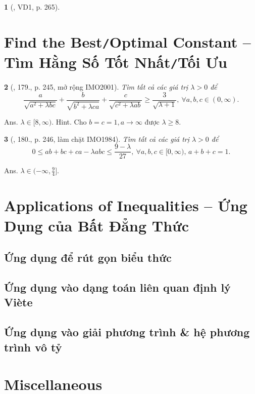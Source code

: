 \documentclass{article}
\newtheorem{baitoan}{}
\begin{document}
\begin{baitoan}[\cite{Khai_Huong_bdt}, VD1, p. 265]
	
\end{baitoan}


\section{Find the Best{\tt/}Optimal Constant -- Tìm Hằng Số Tốt Nhất{\tt/}Tối Ưu}

\begin{baitoan}[\cite{Anh_Quang_bdt_lem}, 179., p. 245, mở rộng IMO2001]
	Tìm tất cả các giá trị $\lambda > 0$ để
	\begin{equation*}
		\frac{a}{\sqrt{a^2 + \lambda bc}} + \frac{b}{\sqrt{b^2 + \lambda ca}} + \frac{c}{\sqrt{c^2 + \lambda ab}}\ge\frac{3}{\sqrt{\lambda + 1}},\ \forall a,b,c\in(0,\infty).
	\end{equation*}
\end{baitoan}
{\sf Ans.} $\lambda\in[8,\infty)$. {\sf Hint.} Cho $b = c = 1,a\to\infty$ được $\lambda\ge8$.

\begin{baitoan}[\cite{Anh_Quang_bdt_lem}, 180., p. 246, làm chặt IMO1984]
	Tìm tất cả các giá trị $\lambda > 0$ để
	\begin{equation*}
		0\le ab + bc + ca - \lambda abc\le\frac{9 - \lambda}{27},\ \forall a,b,c\in[0,\infty),\,a + b + c = 1.
	\end{equation*}
\end{baitoan}
{\sf Ans.} $\lambda\in(-\infty,\frac{9}{4}]$.


\section{Applications of Inequalities -- Ứng Dụng của Bất Đẳng Thức}

\subsection{Ứng dụng để rút gọn biểu thức}

\subsection{Ứng dụng vào dạng toán liên quan định lý Vi\`ete}

\subsection{Ứng dụng vào giải phương trình \& hệ phương trình vô tỷ}


\section{Miscellaneous}


\printbibliography[heading=bibintoc]
\end{document}

